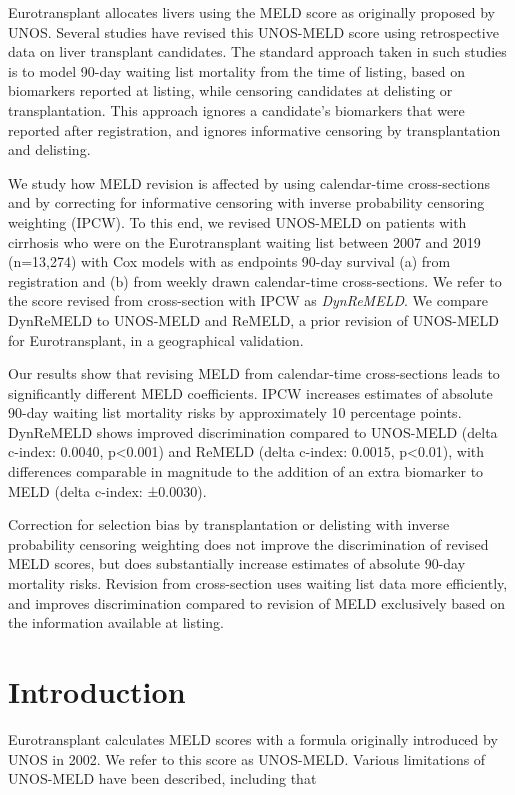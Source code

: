 \documentclass[11pt,twoside,]{book}
\begin{document}
Eurotransplant allocates livers using the MELD score as originally proposed
by UNOS. Several studies have revised this UNOS-MELD score using retrospective
data on liver transplant candidates. The standard approach taken in such studies is to model 90-day
waiting list mortality from the time of listing, based on biomarkers reported at
listing, while censoring candidates at delisting or transplantation. This approach
ignores a candidate's biomarkers that were reported after registration, and ignores informative
censoring by transplantation and delisting.

We study how MELD revision is affected by using calendar-time
cross-sections and by correcting for informative censoring with inverse
probability censoring weighting (IPCW). To this end, we revised UNOS-MELD
on patients with cirrhosis who were on the Eurotransplant waiting list
between 2007 and 2019 (n=13,274) with Cox models with as endpoints
90-day survival (a) from registration and (b) from weekly drawn
calendar-time cross-sections. We refer to the score revised from
cross-section with IPCW as \emph{DynReMELD}. We compare DynReMELD to
UNOS-MELD and ReMELD, a prior revision of UNOS-MELD for Eurotransplant,
in a geographical validation.

Our results show that revising MELD from calendar-time cross-sections leads to significantly
different MELD coefficients. IPCW increases estimates of absolute 90-day
waiting list mortality risks by approximately 10 percentage points.
DynReMELD shows improved discrimination compared to UNOS-MELD (delta c-index:
0.0040, p\textless0.001) and ReMELD (delta c-index: 0.0015, p\textless0.01), with
differences comparable in magnitude to the addition of an extra
biomarker to MELD (delta c-index: ±0.0030).

Correction for selection bias by transplantation or delisting with inverse
probability censoring weighting does not
improve the discrimination of revised MELD scores, but does substantially
increase estimates of absolute 90-day mortality risks. Revision from
cross-section uses waiting list data more efficiently, and improves
discrimination compared to revision of MELD exclusively based on
the information available at listing.

\newpage

\section{Introduction}\label{introduction}

Eurotransplant calculates MELD scores with a formula originally introduced by
UNOS in 2002. We refer to this score as UNOS-MELD. Various limitations of UNOS-MELD
have been described, including that
\end{document}
